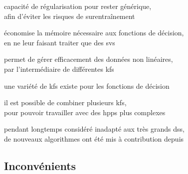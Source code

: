 \begin{itmz}
\end{itmz}\begin{itmz}

\item{capacité de régularisation pour rester générique,\\
afin d’éviter les risques de surentraînement}

\end{itmz}\begin{itmz}

\item{économise la mémoire nécessaire aux fonctions de décision,\\
en ne leur faisant traiter que des \glspl{sv}}

\end{itmz}\begin{itmz}

\item{permet de gérer efficacement des données non linéaires,\\
par l’intermédiaire de différentes \glspl{kf}}

\end{itmz}\begin{itmz}

\item{une variété de \glspl{kf} existe pour les fonctions de décision}

\end{itmz}\begin{itmz}

\item{il est possible de combiner plusieurs \glspl{kf},\\
pour pouvoir travailler avec des \glspl{hpp} plus complexes}

\end{itmz}\begin{itmz}

\item{pendant longtemps considéré inadapté aux très grands \glspl{ds},\\
de nouveaux algorithmes ont été mis à contribution depuis \cite{large-scale}}

\end{itmz}


\subsection{Inconvénients}


